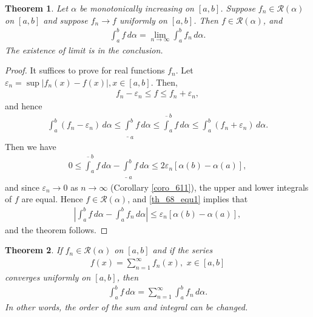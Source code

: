 \documentclass[10pt]{book}
\newtheorem{theorem}{Theorem}[chapter]
\theoremstyle{definition}
\numberwithin{equation}{chapter}
\begin{document}
\begin{theorem}\label{th_68}
Let $\alpha$ be monotonically increasing on $[a,b]$. Suppose $f_n \in \mathscr{R}(\alpha)$ on $[a,b]$ and suppose $f_n \to f$ uniformly on $[a,b]$. Then $f \in \mathscr{R}(\alpha)$, and
\begin{align*}
    \int^b_a f \,d\alpha = \lim_{n\to\infty} \int^b_a f_n \,d\alpha.
\end{align*}
The existence of limit is in the conclusion.
\end{theorem}
\begin{proof}
It suffices to prove for real functions $f_n$. Let $\varepsilon_n = \sup \left|f_n(x) - f(x)\right|, x \in [a,b]$. Then,
\begin{align*}
    f_n - \varepsilon_n \leq f \leq f_n + \varepsilon_n,
\end{align*}
and hence
\begin{align}\label{th_68_equ1}
    \int^b_a (f_n - \varepsilon_n) \,d\alpha \leq \underline{\int}^b_a f \,d\alpha \leq \overline{\int}^b_a f \,d\alpha \leq \int^b_a (f_n + \varepsilon_n) \,d\alpha.
\end{align}
Then we have
\begin{align*}
    0 \leq \overline{\int}^b_a f \,d\alpha - \underline{\int}^b_a f \,d\alpha \leq 2 \varepsilon_n [\alpha(b) - \alpha(a)],
\end{align*}
and since $\varepsilon_n \to 0$ as $n \to \infty$ (Corollary \ref{coro_611}), the upper and lower integrals of $f$ are equal. Hence $f \in \mathscr{R}(\alpha)$, and \eqref{th_68_equ1} implies
that 
\begin{align*}
    \left|\int^b_a f \,d\alpha - \int^b_a f_n \,d\alpha \right| \leq \varepsilon_n [\alpha(b) - \alpha(a)],
\end{align*}
and the theorem follows.
\end{proof}

\medskip

\begin{theorem}
If $f_n \in \mathscr{R}(\alpha)$ on $[a,b]$ and if the series
\begin{align*}
    f(x) = \sum^\infty_{n=1} f_n(x), \,\, x \in [a,b]
\end{align*}
converges uniformly on $[a,b]$, then
\begin{align*}
    \int^b_a f \,d\alpha = \sum^\infty_{n=1} \int^b_a f_n \,d\alpha.
\end{align*}
In other words, the order of the sum and integral can be changed.
\end{theorem}
\end{document}
